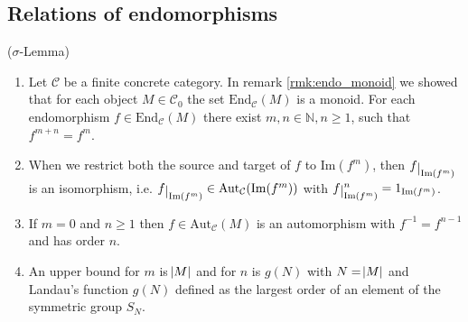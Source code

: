 %
\noindent\begin{minipage}[t]{.55\textwidth}\vspace{0pt}%
\subsection{Relations of endomorphisms}
\begin{lemma}{($\sigma$-Lemma)}\label{la:sigma-lemma}
\begin{enumerate}
\renewcommand{\labelenumi}{(\theenumi)}
\item Let $\mathcal{C}$ be a finite concrete category. In remark \ref{rmk:endo_monoid} we showed that for each object
$M \in \mathcal{C}_{0}$ the set $\mathrm{End}_{\mathcal{C}}(M)$ is a monoid. For each endomorphism $f \in \mathrm{End}_{\mathcal{C}}(M)$
there exist $m,n \in \mathbb{N}, n\geq 1$, such that $f^{m+n}=f^{m}$.
\item When we restrict both the source and target of $f$ to $\mathrm{Im}(f^{m})$, then $f\restrict{\mathrm{Im}(f^{m})}$ is an isomorphism, i.e.
$f\restrict{\mathrm{Im}(f^{m})} \in \mathrm{Aut}_{\mathcal{C}}(\mathrm{Im}(f^{m}))$ with
$f\restrict{\mathrm{Im}(f^{m})}^{n} = 1_{\mathrm{Im}(f^{m})}$.
\item If $m = 0$ and $n \geq 1$ then $f \in \mathrm{Aut}_{\mathcal{C}}(M)$ is an automorphism with $f^{-1} = f^{n-1}$ and has order $n$.
\item An upper bound for $m$ is $\abs{M}$ and for $n$ is $g(N)$ with $N = \abs{M}$ and Landau's function $g(N)$
defined as the largest order of an element of the symmetric group $S_{N}$.
\end{enumerate}
\end{lemma}
\noindent
\begin{minipage}[b]{.45\textwidth}
\end{minipage}
\end{minipage}
